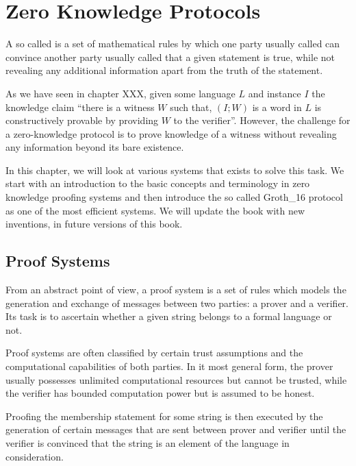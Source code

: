 \chapter{Zero Knowledge Protocols}
A so called  is a set of mathematical rules by which one party usually called  can convince another party usually called  that a given statement is true, while not revealing any additional information apart from the truth of the statement. 

As we have seen in chapter XXX, given some language $L$ and instance $I$ the knowledge claim ``there is a witness $W$ such that,  $(I;W)$ is a word in $L$ is constructively provable by providing $W$ to the verifier''. However, the challenge for a zero-knowledge protocol is to prove knowledge of a witness without revealing any information beyond its bare existence.

In this chapter, we will look at various systems that exists to solve this task. We start with an introduction to the basic concepts and terminology in zero knowledge proofing systems and then introduce the so called Groth\_16 protocol as one of the most efficient systems. We will update the book with new inventions, in future versions of this book.

\section{Proof Systems}
From an abstract point of view, a proof system is a set of rules which models the generation and exchange of messages between two parties: a prover and a verifier. Its task is to ascertain whether a given string belongs to a formal language or not.  

Proof systems are often classified by certain trust assumptions and the computational capabilities of both parties. In it most general form, the prover usually possesses unlimited computational resources but cannot be trusted, while the verifier has bounded computation power but is assumed to be honest.

Proofing the membership statement for some string is then executed by the generation of certain messages that are sent between prover and verifier until the verifier is convinced that the string is an element of the language in consideration.


